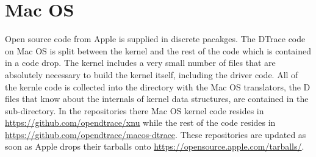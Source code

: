 \section{Mac OS}
\label{sec:macos-code}

Open source code from Apple is supplied in discrete pacakges.  The
DTrace code on Mac OS is split between the  kernel and
the rest of the code which is contained in a  code
drop.  The kernel includes a very small number of files that are
absolutely necessary to build the kernel itself, including the driver
code.  All of the kernle code is collected into the
 directory with the Mac OS translators,
the D files that know about the internals of kernel data structures,
are contained in the  sub-directory.  In the
 repositories there Mac OS kernel code resides in
\url{https://github.com/opendtrace/xnu} while the rest of the code
resides in \url{https://github.com/opendtrace/macos-dtrace}.  These
repositories are updated as soon as Apple drops their tarballs onto
\url{https://opensource.apple.com/tarballs/}.

